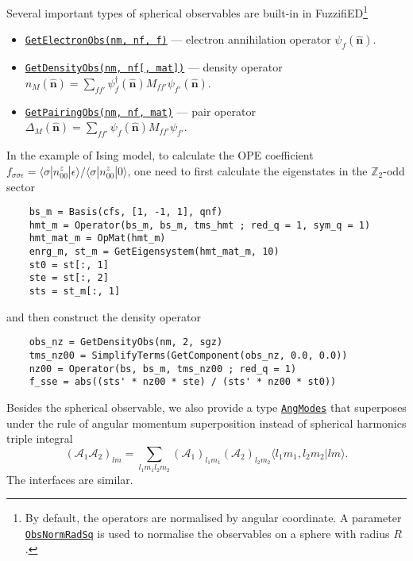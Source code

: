 \documentclass{timesjhep}
\begin{document}
Several important types of spherical observables are built-in in FuzzifiED\footnote{By default, the operators are normalised by angular coordinate. A parameter \href{https://docs.fuzzified.world/core/\#FuzzifiED.ObsNormRadSq}{\lstinline[basicstyle=\ttfamily\scriptsize]|ObsNormRadSq|} is used to normalise the observables on a sphere with radius $R$.}
\begin{itemize}
    \item \href{https://docs.fuzzified.world/models/\#FuzzifiED.GetElectronObs-Tuple{Int64,\%20Int64,\%20Int64}}{\lstinline|GetElectronObs(nm, nf, f)|} --- electron annihilation operator $\psi_f(\hat{\mathbf{n}})$.
    \item \href{https://docs.fuzzified.world/models/\#FuzzifiED.GetDensityObs-Tuple{Int64,\%20Int64,\%20Matrix{\%3C:Number}}}{\lstinline|GetDensityObs(nm, nf[, mat])|} --- density operator $n_M(\hat{\mathbf{n}})=\sum_{ff'}\psi^\dagger_{f}(\hat{\mathbf{n}})M_{ff'}\psi_{f'}(\hat{\mathbf{n}})$.
    \item \href{https://docs.fuzzified.world/models/\#FuzzifiED.GetPairingObs-Tuple{Int64,\%20Int64,\%20Matrix{\%3C:Number}}}{\lstinline|GetPairingObs(nm, nf, mat)|} --- pair operator $\Delta_M(\hat{\mathbf{n}})=\sum_{ff'}\psi_{f}(\hat{\mathbf{n}})M_{ff'}\psi_{f'}$.
\end{itemize}

In the example of Ising model, to calculate the OPE coefficient $f_{\sigma\sigma\epsilon}=\langle \sigma|n^z_{00}|\epsilon\rangle/\langle \sigma|n^z_{00}|0\rangle$, one need to first calculate the eigenstates in the $\mathbb{Z}_2$-odd sector
\begin{lstlisting}
    bs_m = Basis(cfs, [1, -1, 1], qnf)
    hmt_m = Operator(bs_m, bs_m, tms_hmt ; red_q = 1, sym_q = 1)
    hmt_mat_m = OpMat(hmt_m)
    enrg_m, st_m = GetEigensystem(hmt_mat_m, 10)
    st0 = st[:, 1]
    ste = st[:, 2]
    sts = st_m[:, 1]
\end{lstlisting}
and then construct the density operator
\begin{lstlisting}
    obs_nz = GetDensityObs(nm, 2, sgz)
    tms_nz00 = SimplifyTerms(GetComponent(obs_nz, 0.0, 0.0))
    nz00 = Operator(bs, bs_m, tms_nz00 ; red_q = 1)
    f_sse = abs((sts' * nz00 * ste) / (sts' * nz00 * st0))
\end{lstlisting}

Besides the spherical observable, we also provide a type \href{https://docs.fuzzified.world/models/\#FuzzifiED.AngModes}{\lstinline|AngModes|} that superposes under the rule of angular momentum superposition instead of spherical harmonics triple integral
\begin{equation}
    (\mathcal{A}_1\mathcal{A}_2)_{lm}=\sum_{l_1m_1l_2m_2}(\mathcal{A}_1)_{l_1m_1}(\mathcal{A}_2)_{l_2m_2}\langle l_1m_1,l_2m_2|lm\rangle.
\end{equation}
The interfaces are similar.
\end{document}
